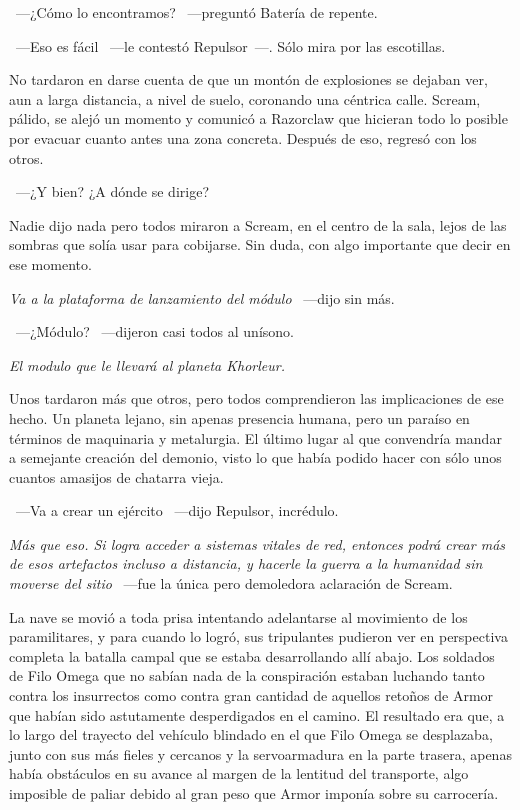 ~---¿Cómo lo encontramos? ~---preguntó Batería de repente.

~---Eso es fácil ~---le contestó Repulsor~---. Sólo mira por las escotillas.

No tardaron en darse cuenta de que un montón de explosiones se dejaban ver, aun a larga distancia, a nivel de suelo, coronando una céntrica calle. Scream, pálido, se alejó un momento y comunicó a Razorclaw que hicieran todo lo posible por evacuar cuanto antes una zona concreta. Después de eso, regresó con los otros.

~---¿Y bien? ¿A dónde se dirige?

Nadie dijo nada pero todos miraron a Scream, en el centro de la sala, lejos de las sombras que solía usar para cobijarse. Sin duda, con algo importante que decir en ese momento.

\emph{Va a la plataforma de lanzamiento del módulo} ~---dijo sin más.

~---¿Módulo? ~---dijeron casi todos al unísono.

\emph{El modulo que le llevará al planeta Khorleur.}

Unos tardaron más que otros, pero todos comprendieron las implicaciones de ese hecho. Un planeta lejano, sin apenas presencia humana, pero un paraíso en términos de maquinaria y metalurgia. El último lugar al que convendría mandar a semejante creación del demonio, visto lo que había podido hacer con sólo unos cuantos amasijos de chatarra vieja.

~---Va a crear un ejército ~---dijo Repulsor, incrédulo.

\emph{Más que eso. Si logra acceder a sistemas vitales de red, entonces podrá crear más de esos artefactos incluso a distancia, y hacerle la guerra a la humanidad sin moverse del sitio} ~---fue la única pero demoledora aclaración de Scream.

\parbreak
La nave se movió a toda prisa intentando adelantarse al movimiento de los paramilitares, y para cuando lo logró, sus tripulantes pudieron ver en perspectiva completa la batalla campal que se estaba desarrollando allí abajo. Los soldados de Filo Omega que no sabían nada de la conspiración estaban luchando tanto contra los insurrectos como contra gran cantidad de aquellos retoños de Armor que habían sido astutamente desperdigados en el camino. El resultado era que, a lo largo del trayecto del vehículo blindado en el que Filo Omega se desplazaba, junto con sus más fieles y cercanos y la servoarmadura en la parte trasera, apenas había obstáculos en su avance al margen de la lentitud del transporte, algo imposible de paliar debido al gran peso que Armor imponía sobre su carrocería.

